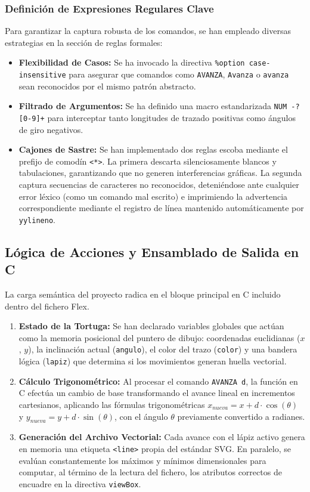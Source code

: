 \documentclass[12pt,a4paper]{article}
\begin{document}
\subsubsection{Definición de Expresiones Regulares Clave}
Para garantizar la captura robusta de los comandos, se han empleado diversas estrategias en la sección de reglas formales:
\begin{itemize}
    \item \textbf{Flexibilidad de Casos:} Se ha invocado la directiva \texttt{\%option case-insensitive} para asegurar que comandos como \texttt{AVANZA}, \texttt{Avanza} o \texttt{avanza} sean reconocidos por el mismo patrón abstracto.
    \item \textbf{Filtrado de Argumentos:} Se ha definido una macro estandarizada \texttt{NUM -?[0-9]+} para interceptar tanto longitudes de trazado positivas como ángulos de giro negativos.
    \item \textbf{Cajones de Sastre:} Se han implementado dos reglas escoba mediante el prefijo de comodín \texttt{<*>}. La primera descarta silenciosamente blancos y tabulaciones, garantizando que no generen interferencias gráficas. La segunda captura secuencias de caracteres no reconocidos, deteniéndose ante cualquier error léxico (como un comando mal escrito) e imprimiendo la advertencia correspondiente mediante el registro de línea mantenido automáticamente por \texttt{yylineno}.
\end{itemize}

\subsection{Lógica de Acciones y Ensamblado de Salida en C}
La carga semántica del proyecto radica en el bloque principal en C incluido dentro del fichero Flex.

\begin{enumerate}
    \item \textbf{Estado de la Tortuga:} Se han declarado variables globales que actúan como la memoria posicional del puntero de dibujo: coordenadas euclidianas ($x$, $y$), la inclinación actual (\texttt{angulo}), el color del trazo (\texttt{color}) y una bandera lógica (\texttt{lapiz}) que determina si los movimientos generan huella vectorial.
    \item \textbf{Cálculo Trigonométrico:} Al procesar el comando \texttt{AVANZA d}, la función en C efectúa un cambio de base transformando el avance lineal en incrementos cartesianos, aplicando las fórmulas trigonométricas $x_{nueva} = x + d \cdot \cos(\theta)$ y $y_{nueva} = y + d \cdot \sin(\theta)$, con el ángulo $\theta$ previamente convertido a radianes.
    \item \textbf{Generación del Archivo Vectorial:} Cada avance con el lápiz activo genera en memoria una etiqueta \texttt{<line>} propia del estándar SVG. En paralelo, se evalúan constantemente los máximos y mínimos dimensionales para computar, al término de la lectura del fichero, los atributos correctos de encuadre en la directiva \texttt{viewBox}.
\end{enumerate}
\end{document}
